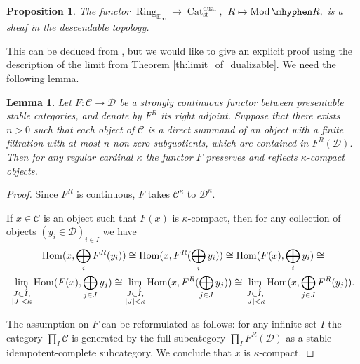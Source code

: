 \documentclass[11pt,leqno]{amsart}
\newtheorem{lemma}[theo]{Lemma}
\newtheorem{prop}[theo]{Proposition}
\numberwithin{equation}{section}
\def\Hom{\operatorname{Hom}}
\newcommand{\hy}{\mhyphen}
\newcommand{\indlim}[1][]{\mathop{\varinjlim}\limits_{#1}}
\newcommand{\Cat}{\operatorname{Cat}}
\newcommand{\Ring}{\operatorname{Ring}}
\newcommand{\st}{\operatorname{st}}
\newcommand{\dual}{\operatorname{dual}}
\newcommand{\bE}{{\mathbb E}}
\newcommand{\cD}{{\mathcal D}}
\newcommand{\cC}{{\mathcal C}}
\newcommand{\Mod}{\operatorname{Mod}}
\begin{document}
\begin{prop}\label{prop:descendable_descent} The functor $\Ring_{\bE_{\infty}}\to \Cat_{\st}^{\dual},$ $R\mapsto \Mod\hy R,$ is a sheaf in the descendable topology.
\end{prop}

This can be deduced from \cite[Corollary 4.85]{Ram24b}, but we would like to give an explicit proof using the description of the limit from Theorem \ref{th:limit_of_dualizable}. We need the following lemma.

\begin{lemma}\label{lem:detects_kappa_compactness} Let $F:\cC\to\cD$ be a strongly continuous functor between presentable stable categories, and denote by $F^R$ its right adjoint. Suppose that there exists $n>0$ such that each object of $\cC$ is a direct summand of an object with a finite filtration with at most $n$ non-zero subquotients, which are contained in $F^R(\cD).$ Then for any regular cardinal $\kappa$ the functor $F$ preserves and reflects $\kappa$-compact objects.\end{lemma}

\begin{proof}Since $F^R$ is continuous, $F$ takes $\cC^{\kappa}$ to $\cD^{\kappa}.$ 

If $x\in\cC$ is an object such that $F(x)$ is $\kappa$-compact, then for any collection of objects $(y_i\in\cD)_{i\in I}$ we have
\begin{multline*}\Hom(x,\bigoplus\limits_i F^R(y_i))\cong \Hom(x,F^R(\bigoplus\limits_i y_i))\cong \Hom(F(x),\bigoplus\limits_i y_i)\cong \\\indlim[\substack{J\subset I,\\ |J|<\kappa}]\Hom(F(x),\bigoplus\limits_{j\in J} y_j)\cong 
\indlim[\substack{J\subset I,\\ |J|<\kappa}]\Hom(x,F^R(\bigoplus\limits_{j\in J} y_j))\cong \indlim[\substack{J\subset I,\\ |J|<\kappa}]\Hom(x,\bigoplus\limits_{j\in J} F^R(y_j)).\end{multline*}

The assumption on $F$ can be reformulated as follows: for any infinite set $I$ the category $\prod_I\cC$ is generated by the full subcategory $\prod_I F^R(\cD)$ as a stable idempotent-complete subcategory. We conclude that $x$ is $\kappa$-compact.
\end{proof}
\end{document}
